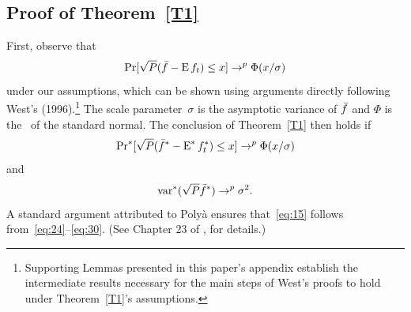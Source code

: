 \documentclass[12pt,fleqn]{article}
\begin{document}
\newcommand{\WesA}[1][]{\oclt{t}
  (F_t^{#1} - \E^{#1} F_t^{#1}) B^{#1} H_t^{#1}}
\newcommand{\WesB}[1][]{\tfrac{1}{\sqrt{P}} \E^{#1} F_t^{#1} \osum{t} (B_t^{#1} -
  B^{#1}) H_t^{#1}}
\newcommand{\WesC}[1][]{\oclt{t}
  (F_t^{#1} - \E^{#1} F_t^{#1}) (B_t^{#1} - B^{#1}) H_t^{#1}}

\subsection*{Proof of Theorem~\ref{T1}}

First, observe that
\begin{equation}\label{eq:24}
  \operatorname{Pr}[\sqrt{P} (\bar f - \operatorname{E} f_t) \leq x] \to^p \Phi(x / \sigma)
\end{equation}
under our assumptions, which can be shown using arguments directly
following West's (1996).\footnote{%
  Supporting Lemmas presented in this paper's appendix establish the
  intermediate results necessary for the main steps of West's proofs
  to hold under Theorem~\ref{T1}'s assumptions.} %
The scale parameter~$\sigma$ is the asymptotic variance of $\bar f$ and
$\Phi$ is the \cdf\ of the standard normal. The conclusion of
Theorem~\ref{T1} then holds if
\begin{equation}\label{eq:23}
  \operatorname{Pr}^*[\sqrt{P} (\bar f^* - \operatorname{E}^* f_t^*) \leq x] \to^p \Phi(x / \sigma)
\end{equation}
and
\begin{equation}\label{eq:30}
  \operatorname{var}^*(\sqrt{P} \bar f^*) \to^p \sigma^2.
\end{equation}
A standard argument attributed to Poly{\`a} ensures that~\eqref{eq:15}
follows from~\eqref{eq:24}--\eqref{eq:30}. (See Chapter 23 of
\citealp{Vaa:00}, for details.)
\end{document}

